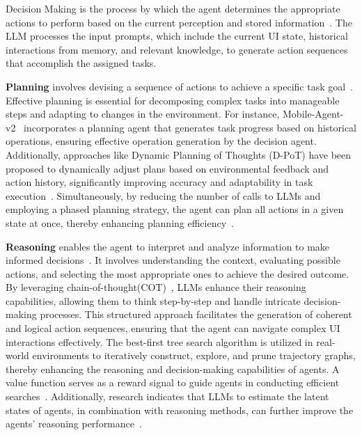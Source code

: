 Decision Making is the process by which the agent determines the appropriate actions to perform based on the current perception and stored information~\cite{xi2023rise}. The LLM processes the input prompts, which include the current UI state, historical interactions from memory, and relevant knowledge, to generate action sequences that accomplish the assigned tasks.


\noindent\textbf{Planning}
involves devising a sequence of actions to achieve a specific task goal~\cite{song2023llm,xi2023rise}. Effective planning is essential for decomposing complex tasks into manageable steps and adapting to changes in the environment. For instance, Mobile-Agent-v2~\cite{wang2024mobileagentv2} incorporates a planning agent that generates task progress based on historical operations, ensuring effective operation generation by the decision agent. Additionally, approaches like Dynamic Planning of Thoughts (D-PoT) have been proposed to dynamically adjust plans based on environmental feedback and action history, significantly improving accuracy and adaptability in task execution~\cite{zhang2024dynamic}. Simultaneously, by reducing the number of calls to LLMs and employing a phased planning strategy, the agent can plan all actions in a given state at once, thereby enhancing planning efficiency~\cite{li2023zero}.



\noindent\textbf{Reasoning}
enables the agent to interpret and analyze information to make informed decisions~\cite{gandhi2024understanding,chen2024optimizing,plaat2024reasoning}. It involves understanding the context, evaluating possible actions, and selecting the most appropriate ones to achieve the desired outcome. By leveraging chain-of-thought(COT)~\cite{wei2022chain}, LLMs enhance their reasoning capabilities, allowing them to think step-by-step and handle intricate decision-making processes. This structured approach facilitates the generation of coherent and logical action sequences, ensuring that the agent can navigate complex UI interactions effectively.
The best-first tree search algorithm is utilized in real-world environments to iteratively construct, explore, and prune trajectory graphs, thereby enhancing the reasoning and decision-making capabilities of agents. A value function serves as a reward signal to guide agents in conducting efficient searches~\cite{koh2024tree}. Additionally, research indicates that LLMs to estimate the latent states of agents, in combination with reasoning methods, can further improve the agents' reasoning performance~\cite{bishop2024latent}.


